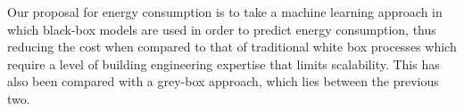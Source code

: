 \documentclass[10pt, conference, compsocconf]{IEEEtran}
\begin{document}

Our proposal for energy consumption is to take a machine learning approach in which black-box models are used in order to predict energy consumption, thus reducing the cost when compared to that of traditional white box processes which require a level of building engineering expertise that limits scalability. This has also been compared with a grey-box approach, which lies between the previous two.









\end{document}
